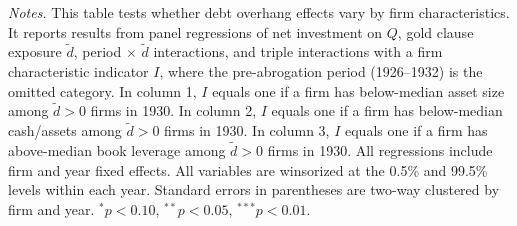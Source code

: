 \begin{table}[p]
\vspace*{3mm} \justifying \noindent
\scriptsize{\textit{Notes.} This table tests whether debt overhang effects vary by firm characteristics. It reports results from panel regressions of net investment on $Q$, gold clause exposure $\tilde{d}$, period $\times$ $\tilde{d}$ interactions, and triple interactions with a firm characteristic indicator $I$, where the pre-abrogation period (1926--1932) is the omitted category. In column 1, $I$ equals one if a firm has below-median asset size among $\tilde{d} > 0$ firms in 1930. In column 2, $I$ equals one if a firm has below-median cash/assets among $\tilde{d} > 0$ firms in 1930. In column 3, $I$ equals one if a firm has above-median book leverage among $\tilde{d} > 0$ firms in 1930. All regressions include firm and year fixed effects. All variables are winsorized at the 0.5\% and 99.5\% levels within each year. Standard errors in parentheses are two-way clustered by firm and year. $^{*}p<0.10$, $^{**}p<0.05$, $^{***}p<0.01$.}
\end{table}